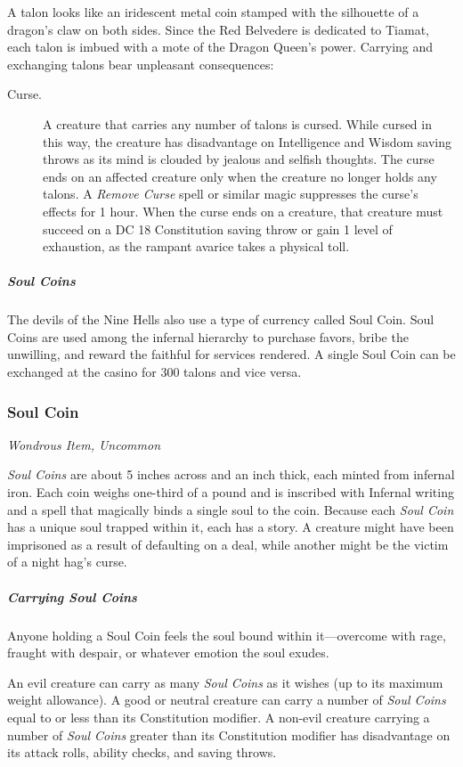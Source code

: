 \documentclass[10pt,a4paper,twoside,bg=print,twocolumn,openany,nodeprecatedcode]{dndbook}
\begin{document}
A talon looks like an iridescent metal coin stamped with the silhouette of a dragon's claw on both sides. Since the Red Belvedere is dedicated to Tiamat, each talon is imbued with a mote of the Dragon Queen's power. Carrying and exchanging talons bear unpleasant consequences:


\begin{description}
\item[Curse.]
A creature that carries any number of talons is cursed. While cursed in this way, the creature has disadvantage on Intelligence and Wisdom saving throws as its mind is clouded by jealous and selfish thoughts. The curse ends on an affected creature only when the creature no longer holds any talons. A \textit{Remove Curse} spell or similar magic suppresses the curse's effects for 1 hour. When the curse ends on a creature, that creature must succeed on a DC 18 Constitution saving throw or gain 1 level of exhaustion, as the rampant avarice takes a physical toll.
\end{description}

\subparagraph{Soul Coins}
The devils of the Nine Hells also use a type of currency called Soul Coin. Soul Coins are used among the infernal hierarchy to purchase favors, bribe the unwilling, and reward the faithful for services rendered. A single Soul Coin can be exchanged at the casino for 300 talons and vice versa.

\subsubsection{Soul Coin}
\textit{Wondrous Item, Uncommon}

\textit{Soul Coins} are about 5 inches across and an inch thick, each minted from infernal iron. Each coin weighs one-third of a pound and is inscribed with Infernal writing and a spell that magically binds a single soul to the coin. Because each \textit{Soul Coin} has a unique soul trapped within it, each has a story. A creature might have been imprisoned as a result of defaulting on a deal, while another might be the victim of a night hag's curse.

\subparagraph{Carrying Soul Coins}
Anyone holding a Soul Coin feels the soul bound within it—overcome with rage, fraught with despair, or whatever emotion the soul exudes.

An evil creature can carry as many \textit{Soul Coins} as it wishes (up to its maximum weight allowance). A good or neutral creature can carry a number of \textit{Soul Coins} equal to or less than its Constitution modifier. A non-evil creature carrying a number of \textit{Soul Coins} greater than its Constitution modifier has disadvantage on its attack rolls, ability checks, and saving throws.
\end{document}
